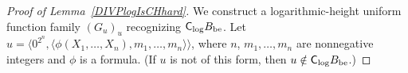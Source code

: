 \begin{proof}[Proof of Lemma~\ref{DIVPlogIsCHhard}]
We construct a logarithmic-height uniform function family $(G_u)_u$
recognizing $\mathsf{C}_{\log} B_{\mathrm{be}}$.
Let $u  = \langle 0^{2^n}, 
\langle \phi(X_1, \dots, X_n), m_1, \dots, m_n \rangle \rangle$, 
where $n$, $m_1, \dots, m_n$ are nonnegative integers 
and $\phi$ is a formula. 
(If $u$ is not of this form, then $u \notin \mathsf{C}_{\log} B_{\mathrm{be}}$.)
 

\end{proof}
